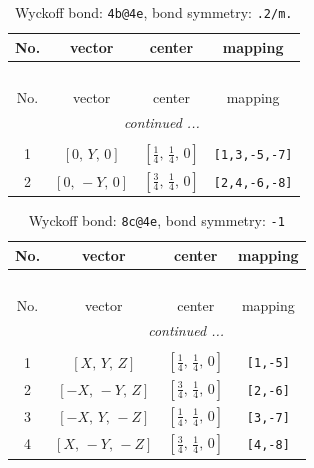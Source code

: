 \documentclass[fleqn,8pt]{jsarticle}
\begin{document}
\renewcommand{\arraystretch}{1.2}
\begin{longtable}{cccc}
\caption{Wyckoff bond: {\tt 4b@4e}, bond symmetry: {\tt .2/m.}}
 \\
 \hline \hline
No. & vector & center & mapping \\ \hline \endfirsthead

\multicolumn{3}{l}{\tablename\ \thetable{}} \\
 \hline \hline
No. & vector & center & mapping \\ \hline \endhead

 \hline \hline
\multicolumn{3}{r}{\footnotesize\it continued ...} \\ \endfoot

 \hline \hline
\multicolumn{3}{r}{} \\ \endlastfoot

1 & $\left[ 0,\, Y,\, 0 \right]$ & $\left[ \frac{1}{4},\, \frac{1}{4},\, 0 \right]$ & {\tt [1,3,-5,-7]} \\ \hline
2 & $\left[ 0,\, - Y,\, 0 \right]$ & $\left[ \frac{3}{4},\, \frac{1}{4},\, 0 \right]$ & {\tt [2,4,-6,-8]} \\
\end{longtable}
\renewcommand{\arraystretch}{1.2}
\begin{longtable}{cccc}
\caption{Wyckoff bond: {\tt 8c@4e}, bond symmetry: {\tt -1}}
 \\
 \hline \hline
No. & vector & center & mapping \\ \hline \endfirsthead

\multicolumn{3}{l}{\tablename\ \thetable{}} \\
 \hline \hline
No. & vector & center & mapping \\ \hline \endhead

 \hline \hline
\multicolumn{3}{r}{\footnotesize\it continued ...} \\ \endfoot

 \hline \hline
\multicolumn{3}{r}{} \\ \endlastfoot

1 & $\left[ X,\, Y,\, Z \right]$ & $\left[ \frac{1}{4},\, \frac{1}{4},\, 0 \right]$ & {\tt [1,-5]} \\ \hline
2 & $\left[ - X,\, - Y,\, Z \right]$ & $\left[ \frac{3}{4},\, \frac{1}{4},\, 0 \right]$ & {\tt [2,-6]} \\ \hline
3 & $\left[ - X,\, Y,\, - Z \right]$ & $\left[ \frac{1}{4},\, \frac{1}{4},\, 0 \right]$ & {\tt [3,-7]} \\ \hline
4 & $\left[ X,\, - Y,\, - Z \right]$ & $\left[ \frac{3}{4},\, \frac{1}{4},\, 0 \right]$ & {\tt [4,-8]} \\
\end{longtable}
\end{document}
